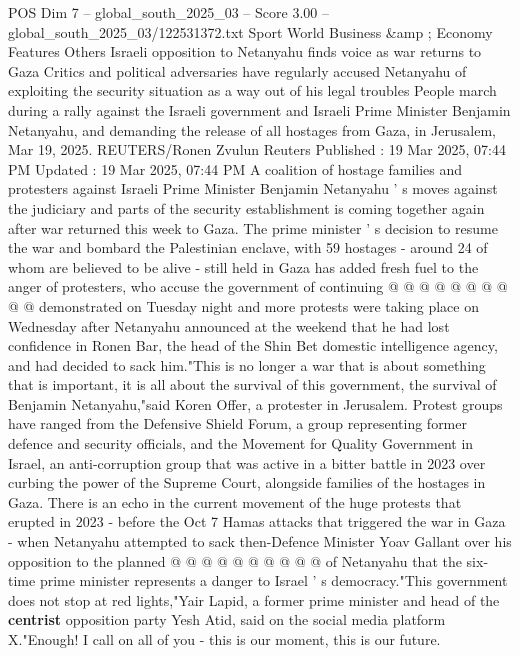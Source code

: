 \begin{textsample}{POS Dim 7 – global\_south\_2025\_03 – Score 3.00 – global\_south\_2025\_03/122531372.txt}  \label{ex:f7_pos_434}
Sport World Business \&amp ; Economy Features Others Israeli opposition to Netanyahu finds voice as war returns to Gaza Critics and political adversaries have regularly accused Netanyahu of exploiting the security situation as a way out of his legal troubles People march during a rally against the Israeli government and Israeli Prime Minister Benjamin Netanyahu, and demanding the release of all hostages from Gaza, in Jerusalem, Mar 19, 2025.
REUTERS/Ronen Zvulun Reuters Published : 19 Mar 2025, 07:44 PM Updated : 19 Mar 2025, 07:44 PM A coalition of hostage families and protesters against Israeli Prime Minister Benjamin Netanyahu ' s moves against the judiciary and parts of the security establishment is coming together again after war returned this week to Gaza.
The prime minister ' s decision to resume the war and bombard the Palestinian enclave, with 59 hostages - around 24 of whom are believed to be alive - still held in Gaza has added fresh fuel to the anger of protesters, who accuse the government of continuing @ @ @ @ @ @ @ @ @ @ demonstrated on Tuesday night and more protests were taking place on Wednesday after Netanyahu announced at the weekend that he had lost confidence in Ronen Bar, the head of the Shin Bet domestic intelligence agency, and had decided to sack him."This is no longer a war that is about something that is important, it is all about the survival of this government, the survival of Benjamin Netanyahu,"said Koren Offer, a protester in Jerusalem.
Protest groups have ranged from the Defensive Shield Forum, a group representing former defence and security officials, and the Movement for Quality Government in Israel, an anti-corruption group that was active in a bitter battle in 2023 over curbing the power of the Supreme Court, alongside families of the hostages in Gaza.
There is an echo in the current movement of the huge protests that erupted in 2023 - before the Oct 7 Hamas attacks that triggered the war in Gaza - when Netanyahu attempted to sack then-Defence Minister Yoav Gallant over his opposition to the planned @ @ @ @ @ @ @ @ @ @ of Netanyahu that the six-time prime minister represents a danger to Israel ' s democracy."This government does not stop at red lights,"Yair Lapid, a former prime minister and head of the \textbf{centrist} opposition party Yesh Atid, said on the social media platform X."Enough!
I call on all of you - this is our moment, this is our future.

\end{textsample}
